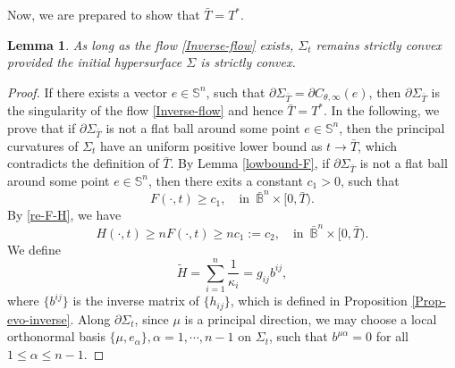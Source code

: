 \documentclass[11pt,reqno]{amsart}
\newtheorem{lem}[thm]{Lemma}
\theoremstyle{definition}
\theoremstyle{remark}
\numberwithin{equation}{section}
\renewcommand{\(}{\left(}
\renewcommand{\)}{\right)}
\renewcommand{\-}{\overline}
\begin{document}
Now, we are prepared to show that $\bar{T}=T^{*}$.
\begin{lem}\label{Lem-pconvex}
	As long as the flow \eqref{Inverse-flow} exists, $\Sigma_t$ remains strictly convex provided the initial hypersurface $\Sigma$ is strictly convex.
\end{lem}
\begin{proof}
If there exists a vector $e\in\mathbb{S}^n$, such that $\partial\Sigma_{\bar{T}}=\partial C_{\theta,\infty}(e)$, then $\partial\Sigma_{\bar{T}}$ is the singularity of the flow \eqref{Inverse-flow} and hence $\bar{T}=T^{*}$. In the following, we prove that if $\partial\Sigma_{\bar{T}}$ is not a flat ball around some point $e\in\mathbb{S}^n$, then the principal curvatures of $\Sigma_t$ have an uniform positive lower bound as $t\to\bar{T}$, which contradicts the definition of $\bar{T}$. By Lemma \ref{lowbound-F}, if $\partial\Sigma_{\bar{T}}$ is not a flat ball around some point $e\in\mathbb{S}^n$, then there exits a constant $c_1>0$, such that  
\begin{equation*}
	F(\cdot,t)\geq c_1,\quad \text{in}\,\,\,\bar{\mathbb{B}}^n\times[0,\bar{T}).
\end{equation*}
By \eqref{re-F-H}, we have
\begin{equation}\label{lowbound-H}
	H(\cdot,t)\geq nF(\cdot,t)\geq  nc_1:=c_2,\quad \text{in}\,\,\,\bar{\mathbb{B}}^n\times[0,\bar{T}).
\end{equation}
We define 
\begin{equation}
	\tilde{H}=\sum_{i=1}^n{\frac{1}{\kappa_i}}=g_{ij}b^{ij},
\end{equation}
where $\{b^{ij}\}$ is the inverse matrix of $\{h_{ij}\}$, which is defined in Proposition \ref{Prop-evo-inverse}. Along $\partial\Sigma_t$,  since $\mu$ is a principal direction, we may choose  a local orthonormal basis  $\{\mu,e_{\alpha}\},\alpha=1,\cdots,n-1$  on $\Sigma_t$, such that $b^{\mu\alpha}=0$ for all $1\leq\alpha\leq n-1$. 


\end{proof}
\end{document}
